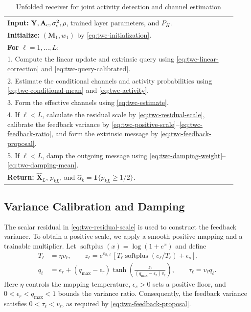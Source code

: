 \begin{table}[t]
\centering
\caption{Unfolded receiver for joint activity detection and channel estimation}
\label{tab:twc-algorithm}
\begin{tabular}{p{0.93\linewidth}}
\toprule
\textbf{Input:} $\mathbf Y,\mathbf A_{\rm c},\sigma_{\rm c}^2,\rho$,
trained layer parameters, and $P_H$.\\
\textbf{Initialize:} $(\mathbf M_1,w_1)$ by \eqref{eq:twc-initialization}.\\
\textbf{For} $\ell=1,\ldots,L$:\\
1. Compute the linear update and extrinsic query using
\eqref{eq:twc-linear-correction} and \eqref{eq:twc-query-calibrated}.\\
2. Estimate the conditional channels and activity probabilities
using \eqref{eq:twc-conditional-mean} and \eqref{eq:twc-activity}.\\
3. Form the effective channels using \eqref{eq:twc-estimate}.\\
4. If $\ell<L$, calculate the residual scale by \eqref{eq:twc-residual-scale},
calibrate the feedback variance by
\eqref{eq:twc-positive-scale}--\eqref{eq:twc-feedback-ratio}, and
form the extrinsic message by \eqref{eq:twc-feedback-proposal}.\\
5. If $\ell<L$, damp the outgoing message using
\eqref{eq:twc-damping-weight}--\eqref{eq:twc-damping-mean}.\\
\textbf{Return:} $\widehat{\mathbf X}_L$, $p_{kL}$,
and $\widehat\alpha_k=\mathbf1\{p_{kL}\geq1/2\}$.\\
\bottomrule
\end{tabular}
\end{table}

\subsection{Variance Calibration and Damping}
\label{sec:twc-damping}

The scalar residual in \eqref{eq:twc-residual-scale} is used to
construct the feedback variance. To obtain a positive scale, we
apply a smooth positive mapping and a trainable multiplier.
Let $\operatorname{softplus}(x)=\log(1+e^x)$ and define
\begin{align}
 T_\ell&=\eta v_\ell,\qquad
 z_\ell=e^{c_{\beta,\ell}}
 [T_\ell\operatorname{softplus}(e_\ell/T_\ell)+\epsilon_s],
 \label{eq:twc-positive-scale}\\
 q_\ell&=\epsilon_r+(q_{\max}-\epsilon_r)
 \tanh\!\left(\frac{z_\ell}{(q_{\max}-\epsilon_r)v_\ell}\right),
 \qquad \tau_\ell=v_\ell q_\ell.
 \label{eq:twc-feedback-ratio}
\end{align}
Here $\eta$ controls the mapping temperature, $\epsilon_s>0$
sets a positive floor, and $0<\epsilon_r<q_{\max}<1$ bounds
the variance ratio. Consequently, the feedback variance satisfies
$0<\tau_\ell<v_\ell$, as required by
\eqref{eq:twc-feedback-proposal}.

